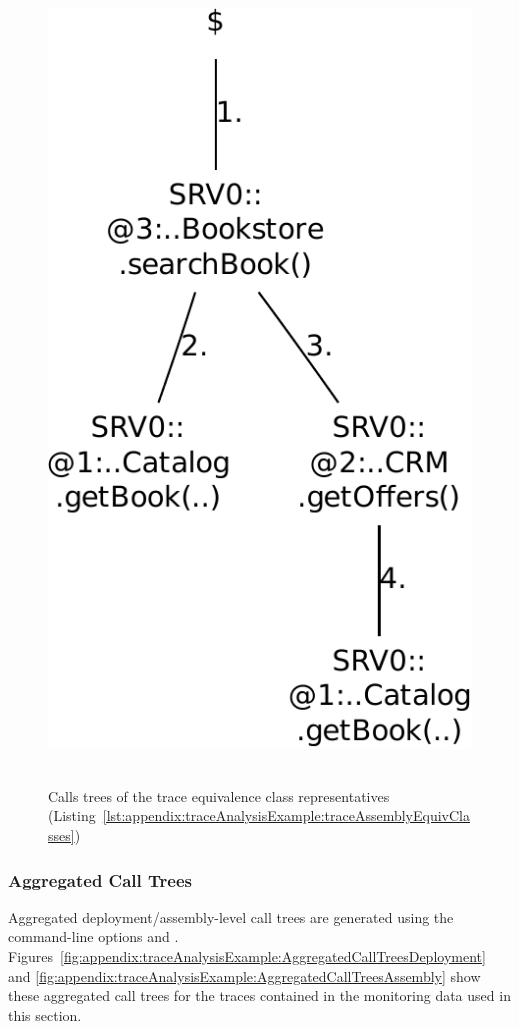 \begin{figure}[h]
{\ \ \includegraphics[scale=0.4]{images/example-plots/callTree-6488138950668976141-crop}\ \ 
}
\caption{Calls trees of the trace %
equivalence class representatives (Listing~\ref{lst:appendix:traceAnalysisExample:traceAssemblyEquivClasses})}
\label{fig:appendix:traceAnalysisExample:TraceCallTrees}
\end{figure}


\subsubsection{Aggregated Call Trees}\label{sec:example:aggregatedCallTrees}%

Aggregated deployment/assembly-level call trees are generated using the command-line options %
\OPT{\OPTplotAggregatedDeploymentCallTree} and \OPT{\OPTplotAggregatedAssemblyCallTree}. %
Figures~\ref{fig:appendix:traceAnalysisExample:AggregatedCallTreesDeployment} and \ref{fig:appendix:traceAnalysisExample:AggregatedCallTreesAssembly} %
show these aggregated call trees for the traces contained in the monitoring data %
used in this section. %

